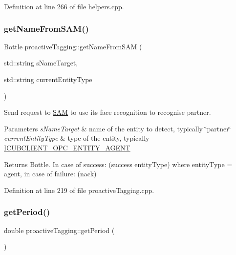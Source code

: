Definition at line 266 of file helpers.\+cpp.

\mbox{\label{classproactiveTagging_a7d77039a8eb90ea145043d28a2b5435c}} 
\subsubsection{\texorpdfstring{get\+Name\+From\+S\+A\+M()}{getNameFromSAM()}}
{\footnotesize\ttfamily Bottle proactive\+Tagging\+::get\+Name\+From\+S\+AM (\begin{DoxyParamCaption}\item[{std\+::string}]{s\+Name\+Target,  }\item[{std\+::string}]{current\+Entity\+Type }\end{DoxyParamCaption})}



Send request to \hyperlink{namespaceSAM}{S\+AM} to use its face recognition to recognise partner. 


\begin{DoxyParams}{Parameters}
{\em s\+Name\+Target} & name of the entity to detect, typically \char`\"{}partner\char`\"{} \\
\hline
{\em current\+Entity\+Type} & type of the entity, typically \hyperlink{group__icubclient__tags_ga344c831a91baa7409cf3b36a7442bdb4}{I\+C\+U\+B\+C\+L\+I\+E\+N\+T\+\_\+\+O\+P\+C\+\_\+\+E\+N\+T\+I\+T\+Y\+\_\+\+A\+G\+E\+NT} \\
\hline
\end{DoxyParams}
\begin{DoxyReturn}{Returns}
Bottle. In case of success\+: (success entity\+Type) where entity\+Type = agent, in case of failure\+: (nack) 
\end{DoxyReturn}


Definition at line 219 of file proactive\+Tagging.\+cpp.

\mbox{\label{classproactiveTagging_a0535c03567fa716dbcb91b5a801be0ff}} 
\subsubsection{\texorpdfstring{get\+Period()}{getPeriod()}}
{\footnotesize\ttfamily double proactive\+Tagging\+::get\+Period (\begin{DoxyParamCaption}{ }\end{DoxyParamCaption})\hspace{0.3cm}{\ttfamily [inline]}}



